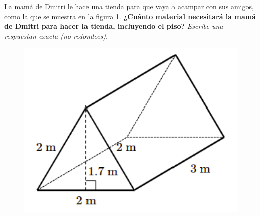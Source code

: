 La mamá de Dmitri le hace una tienda para que vaya a acampar con sus amigos,
como la que se muestra en la figura \ref{fig:prob_verb_superficie_03}.
\textbf{¿Cuánto material necesitará la mamá de Dmitri para hacer la tienda, incluyendo el piso?}
\textit{Escribe una respuestan exacta (no redondees).}

\begin{minipage}{0.3\linewidth}
    \begin{figure}[H]
        \begin{center}
            \includegraphics[width=1\textwidth]{../images/prob_verb_superficie_03}
        \end{center}
        \caption{}
        \label{fig:prob_verb_superficie_03}
    \end{figure}
\end{minipage}
\begin{minipage}{0.7\linewidth}
    \begin{solutionbox}{6cm}
    \end{solutionbox}
\end{minipage}
